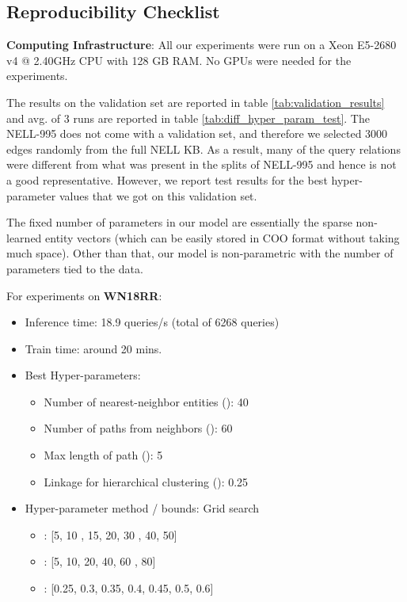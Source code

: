 \documentclass[11pt,a4paper]{article}
\newcommand{\nell}{NELL-995\xspace}
\newcommand{\wn}{WN18RR\xspace}
\begin{document}
\subsection{Reproducibility Checklist}
\label{sub:repro_check}
\noindent\textbf{Computing Infrastructure}: All our experiments were run on a Xeon E5-2680 v4 @ 2.40GHz CPU with 128 GB RAM. No GPUs were needed for the experiments.   

The results on the validation set are reported in table \ref{tab:validation_results} and avg. of 3 runs are reported in table \ref{tab:diff_hyper_param_test}. The \nell does not come with a validation set, and therefore we selected 3000 edges randomly from the full NELL KB. As a result, many of the query relations were different from what was present in the splits of \nell and hence is not a good representative. However, we report test results for the best hyper-parameter values that we got on this validation set. 

The fixed number of parameters in our model are essentially the sparse non-learned entity vectors (which can be easily stored in COO format without taking much space). Other than that, our model is non-parametric with the number of parameters tied to the data.

For experiments on \textbf{\wn}:
\begin{itemize}
    \item Inference time: 18.9 queries/s (total of 6268 queries)
    \item Train time: around 20 mins.
    \item Best Hyper-parameters: 
    \begin{itemize}
        \item Number of nearest-neighbor entities (): 40
        \item Number of paths from neighbors (): 60
        \item Max length of path (): 5
        \item Linkage for hierarchical clustering (): 0.25
    \end{itemize}
    \item Hyper-parameter method / bounds: Grid search
    \begin{itemize}
        \item : [5, 10 , 15, 20, 30 , 40, 50]
        \item : [5, 10, 20, 40, 60 , 80]
        \item : [0.25, 0.3, 0.35, 0.4, 0.45, 0.5, 0.6]
    \end{itemize}
     
\end{itemize}
\end{document}
